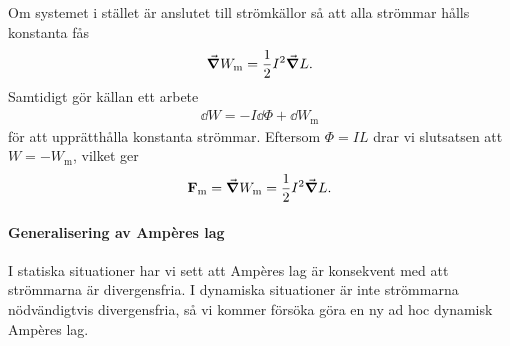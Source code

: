 Om systemet i stället är anslutet till strömkällor så att alla strömmar hålls konstanta fås
\begin{align*}
	\grad{W_{\text{m}}} = \frac{1}{2}I^{2}\grad{L}.
\end{align*}
Samtidigt gör källan ett arbete
\begin{align*}
	\dd{W} = -I\dd{\Phi} + \dd{W_{\text{m}}}
\end{align*}
för att upprätthålla konstanta strömmar. Eftersom $\Phi = IL$ drar vi slutsatsen att $W = -W_{\text{m}}$, vilket ger
\begin{align*}
	\vb{F}_{\text{m}} = \grad{W_{\text{m}}} = \frac{1}{2}I^{2}\grad{L}.
\end{align*}

\paragraph{Generalisering av Ampères lag}
I statiska situationer har vi sett att Ampères lag är konsekvent med att strömmarna är divergensfria. I dynamiska situationer är inte strömmarna nödvändigtvis divergensfria, så vi kommer försöka göra en ny ad hoc dynamisk Ampères lag.

